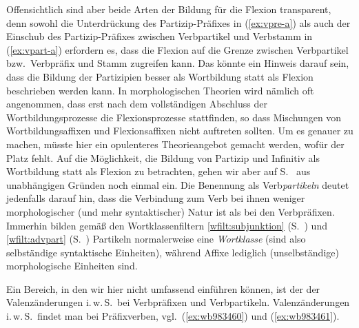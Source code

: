\begin{exe}
\end{exe}

\label{abs:praefixundflex}Offensichtlich sind aber beide Arten der Bildung für die Flexion transparent, denn sowohl die Unterdrückung des Partizip-Präfixes in (\ref{ex:vpre-a}) als auch der Einschub des Partizip-Präfixes zwischen Verbpartikel und Verbstamm in (\ref{ex:vpart-a}) erfordern es, dass die Flexion auf die Grenze zwischen Verbpartikel bzw.\ Verbpräfix und Stamm zugreifen kann.
Das könnte ein Hinweis darauf sein, dass die Bildung der Partizipien besser als Wortbildung statt als Flexion beschrieben werden kann.
In morphologischen Theorien wird nämlich oft angenommen, dass erst nach dem vollständigen Abschluss der Wortbildungsprozesse die Flexionsprozesse stattfinden, so dass Mischungen von Wortbildungsaffixen und Flexionsaffixen nicht auftreten sollten.
Um es genauer zu machen, müsste hier ein opulenteres Theorieangebot gemacht werden, wofür der Platz fehlt.
Auf die Möglichkeit, die Bildung von Partizip und Infinitiv als Wortbildung statt als Flexion zu betrachten, gehen wir aber auf S.\ \pageref{abs:infinwortbild} aus unabhängigen Gründen noch einmal ein.
Die Benennung als Verb\textit{partikeln} deutet jedenfalls darauf hin, dass die Verbindung zum Verb bei ihnen weniger morphologischer (und mehr syntaktischer) Natur ist als bei den Verbpräfixen.
Immerhin bilden gemäß den Wortklassenfiltern \ref{wfilt:subjunktion} (S.~\pageref{wfilt:subjunktion}) und \ref{wfilt:advpart} (S.~\pageref{wfilt:advpart}) Partikeln normalerweise eine \textit{Wortklasse} (sind also selbständige syntaktische Einheiten), während Affixe lediglich (unselbständige) morphologische Einheiten sind.

Ein Bereich, in den wir hier nicht umfassend einführen können, ist der der Valenzänderungen i.\,w.\,S.\ bei Verbpräfixen und Verbpartikeln.
Valenzänderungen i.\,w.\,S.\ findet man bei Präfixverben, vgl.\ (\ref{ex:wb983460}) und (\ref{ex:wb983461}).

